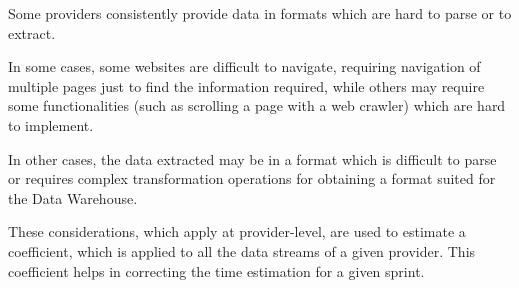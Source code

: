     Some providers consistently provide data in formats which are hard to parse or to extract.
    
    In some cases, some websites are difficult to navigate, requiring navigation of multiple pages just to find the information required, while others may require some functionalities (such as scrolling a page with a web crawler) which are hard to implement.
    
    In other cases, the data extracted may be in a format which is difficult to parse or requires complex transformation operations for obtaining a format suited for the Data Warehouse.
    
    These considerations, which apply at provider-level, are used to estimate a coefficient, which is applied to all the data streams of a given provider.
    This coefficient helps in correcting the time estimation for a given sprint.